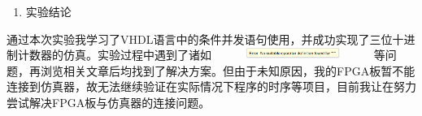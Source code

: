 \documentclass{article} %
\begin{document}
\begin{enumerate}
    \item  实验结论
\end{enumerate}

通过本次实验我学习了VHDL语言中的条件并发语句使用，并成功实现了三位十进制计数器的仿真。实验过程中遇到了诸如\includegraphics*[width=2.08in, height=0.15in]{image11}等问题，再浏览相关文章后均找到了解决方案。但由于未知原因，我的FPGA板暂不能连接到仿真器，故无法继续验证在实际情况下程序的时序等项目，目前我让在努力尝试解决FPGA板与仿真器的连接问题。
\end{document}
